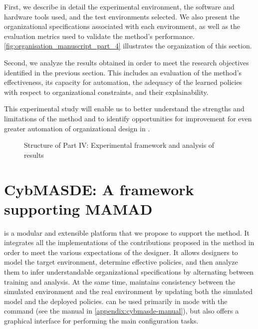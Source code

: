 \medskip

\noindent
First, we describe in detail the experimental environment, the software and hardware tools used, and the test environments selected. We also present the organizational specifications associated with each environment, as well as the evaluation metrics used to validate the method's performance. \autoref{fig:organisation_manuscript_part_4} illustrates the organization of this section.

\medskip

\noindent
Second, we analyze the results obtained in order to meet the research objectives identified in the previous section. This includes an evaluation of the method's effectiveness, its capacity for automation, the adequacy of the learned policies with respect to organizational constraints, and their explainability.

\medskip

\noindent
This experimental study will enable us to better understand the strengths and limitations of the  method and to identify opportunities for improvement for even greater automation of organizational design in .

\begin{figure}[h!]
  \centering
  \resizebox{0.7\linewidth}{!}{%
    
  }
  \caption{Structure of Part IV: Experimental framework and analysis of results}
  \label{fig:organisation_manuscript_part_4}
\end{figure}

\clearpage
\thispagestyle{empty}
\null
\newpage

\chapter{CybMASDE: A framework supporting MAMAD}
\label{sec:cybmasde}


\footnotemark[1] is a modular and extensible platform that we propose to support the  method. It integrates all the implementations of the contributions proposed in the method in order to meet the various expectations of the designer.
It allows designers to model the target environment, determine effective policies, and then analyze them to infer understandable organizational specifications by alternating between training and analysis. At the same time,  maintains consistency between the simulated environment and the real environment by updating both the simulated model and the deployed policies.
%
 can be used primarily in  mode with the  command (see the manual in \autoref{appendix:cybmasde-manual}), but also offers a graphical interface for performing the main configuration tasks.


